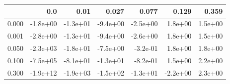 \begin{tabular}{lrrrrrr}
\toprule
{} &      0.0 &     0.01 &    0.027 &    0.077 &    0.129 &   0.359 \\
\midrule
0.000 & -1.8e+00 & -1.3e+01 & -9.4e+00 & -2.5e+00 &  1.8e+00 & 1.5e+00 \\
0.001 & -2.8e+00 & -1.3e+01 & -9.4e+00 & -2.6e+00 &  1.8e+00 & 1.5e+00 \\
0.050 & -2.3e+03 & -1.8e+01 & -7.5e+00 & -3.2e-01 &  1.8e+00 & 1.8e+00 \\
0.100 & -7.5e+05 & -8.1e+01 & -1.3e+01 & -8.2e-01 &  1.5e+00 & 2.2e+00 \\
0.300 & -1.9e+12 & -1.9e+03 & -1.5e+02 & -1.3e+01 & -2.2e+00 & 2.3e+00 \\
\bottomrule
\end{tabular}
